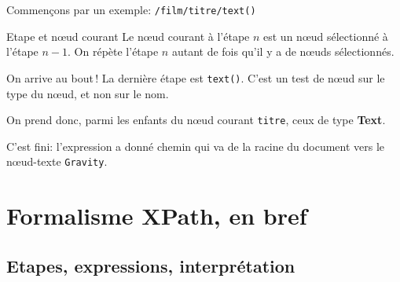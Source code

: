 \begin{frame}[allowframebreaks]{Commen\c{c}ons par un exemple: \texttt{/film/titre/text()}}
\vfill
\begin{block}{Etape et nœud courant}
Le nœud courant à l'étape $n$ est un nœud sélectionné à l'étape $n-1$. On répète l'étape $n$
autant de fois qu'il y a de nœuds sélectionnés.
\end{block}

\framebreak

On arrive au bout\,! La dernière étape est \texttt{text()}. C'est un test de nœud sur le
\alert{type} du nœud, et non sur le nom.

\vfill

On prend donc, parmi les enfants du nœud courant \texttt{titre}, ceux de type \textbf{Text}.

\vfill


\vfill

C'est fini: l'expression a donné  chemin 
qui va de la racine du document vers le nœud-texte \texttt{Gravity}.

\end{frame}

\section{Formalisme XPath, en bref}

\subsection{Etapes, expressions, interprétation}

